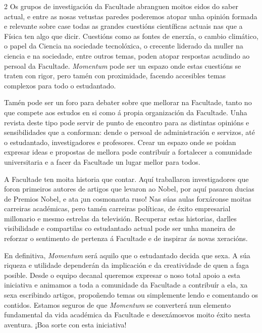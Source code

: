 \begin{multicols}{2}
Os grupos de investigación da Facultade abranguen moitos eidos do saber actual,
e entre as nosas vetustas paredes poderemos atopar unha opinión formada e
relevante sobre case todas as grandes cuestións científicas actuais nas que a
Física ten algo que dicir. Cuestións como as fontes de enerxía, o cambio
climático, o papel da Ciencia na sociedade tecnolóxica, o crecente liderado da
muller na ciencia e na sociedade, entre outros temas, poden atopar respostas
acudindo ao persoal da Facultade. \textit{Momentum} pode ser un espazo onde estas
cuestións se traten con rigor, pero tamén con proximidade, facendo accesibles
temas complexos para todo o estudantado.

Tamén pode ser un foro para debater sobre que mellorar na Facultade, tanto no
que compete aos estudos en si como á propia organización da Facultade. Unha
revista deste tipo pode servir de punto de encontro para as distintas opinións
e sensibilidades que a conforman: dende o persoal de administración e servizos,
até o estudantado, investigadores e profesores. Crear un espazo onde se poidan
expresar ideas e propostas de mellora pode contribuír a fortalecer a comunidade
universitaria e a facer da Facultade un lugar mellor para todos.

A Facultade ten moita historia que contar. Aquí traballaron investigadores que
foron primeiros autores de artigos que levaron ao Nobel, por aquí pasaron
ducias de Premios Nobel, e ata ¡un cosmonauta ruso! Nas súas aulas forxáronse
moitas carreiras académicas, pero tamén carreiras políticas, de éxito
empresarial millonario e mesmo estrelas da televisión. Recuperar estas
historias, darlles visibilidade e compartilas co estudantado actual pode ser
unha maneira de reforzar o sentimento de pertenza á Facultade e de inspirar ás
novas xeracións.

En definitiva, \textit{Momentum} será aquilo que o estudantado decida que sexa. A súa
riqueza e utilidade dependerán da implicación e da creatividade de quen a faga
posible. Desde o equipo decanal queremos expresar o noso total apoio a esta
iniciativa e animamos a toda a comunidade da Facultade a contribuír a ela, xa
sexa escribindo artigos, propoñendo temas ou simplemente lendo e comentando os
contidos. Estamos seguros de que \textit{Momentum} se converterá nun elemento
fundamental da vida académica da Facultade e desexámosvos moito éxito nesta
aventura. ¡Boa sorte con esta iniciativa!

\end{multicols}
